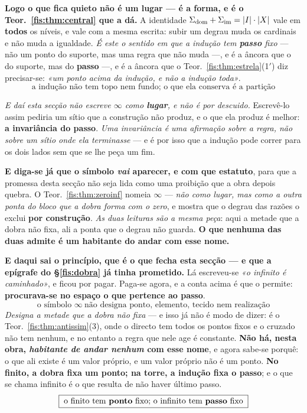 \documentclass[livro.tex]{subfiles}
\begin{document}
\medskip\noindent\textbf{Logo o que fica quieto não é um lugar --- é a forma, e é
o Teor.~\ref{fis:thm:central} que a dá.} A identidade
$\Sigma_{\mathrm{dom}}+\Sigma_{\mathrm{im}}=\lvert I\rvert\cdot\lvert X\rvert$ vale em
\textbf{todos} os níveis, e vale com a mesma escrita: subir um degrau muda os
cardinais e não muda a igualdade. \emph{É este o sentido em que a indução tem
\textbf{passo} fixo} --- não um ponto do suporte, mas uma regra que não muda ---, e é a âncora que o
do suporte, mas do \textbf{passo} ---, e é a âncora que o
Teor.~\ref{fis:thm:estrela}(1$'$) diz precisar-se: \emph{«um ponto acima da
indução, e não a indução toda»}.
\[
\boxed{\;\text{a indução não tem topo nem fundo; o que ela conserva é a partição}\;}
\]

\medskip\noindent\emph{E daí esta secção não escreve $\infty$ como \textbf{lugar},
e não é por descuido.} Escrevê-lo assim pediria um sítio que a construção não
produz, e o que ela produz é melhor: \textbf{a invariância do passo}. \emph{Uma
invariância é uma afirmação sobre a regra, não sobre um sítio onde ela
terminasse} --- e é por isso que a indução pode correr para os dois lados sem que
se lhe peça um fim.

\smallskip\noindent\textbf{E diga-se já que o símbolo \emph{vai} aparecer, e com
que estatuto}, para que a promessa desta secção não seja lida como uma proibição
que a obra depois quebra. O Teor.~\ref{fis:thm:zeroinf} nomeia $\infty$
--- \emph{não como lugar, mas como a outra ponta do bloco que a dobra forma com o
zero}, e mostra que o degrau das razões o exclui \textbf{por construção}.
\emph{As duas leituras são a mesma peça}: aqui a metade que a dobra não fixa,
ali a ponta que o degrau não guarda. \textbf{O que nenhuma das duas admite é um
habitante do andar com esse nome.}


\medskip\noindent\textbf{E daqui sai o princípio, que é o que fecha esta secção
--- e que a epígrafe do §\ref{fis:dobra} já tinha prometido.} Lá escreveu-se
\emph{«o infinito é caminhado»}, e ficou por pagar. Paga-se agora, e a conta
acima é que o permite: \textbf{procurava-se no espaço o que pertence ao passo}.
\[
\boxed{\;\text{o s\'imbolo }\infty\ \text{n\~ao designa ponto, elemento, tecido nem realiza\c{c}\~ao}\;}
\]
\emph{Designa a metade que a dobra não fixa} --- e isso já não é modo de dizer:
é o Teor.~\ref{fis:thm:antissim}(3), onde o directo tem todos os pontos fixos e
o cruzado não tem nenhum, e no entanto a regra que nele age é constante.
\textbf{Não há, nesta obra, \emph{habitante de andar nenhum} com esse nome}, e agora sabe-se
porquê: o que ali existe é um valor próprio, e um valor próprio não é um ponto.
\textbf{No finito, a dobra fixa um ponto; na torre, a indução fixa o passo}; e o
que se chama infinito é o que resulta de não haver último passo.
\[
\boxed{\;\text{o finito tem \textbf{ponto} fixo; o infinito tem \textbf{passo} fixo}\;}
\]
\end{document}
